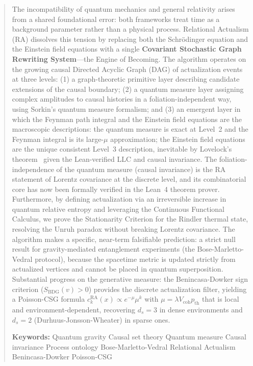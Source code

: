 \documentclass[11pt,a4paper]{article}
\theoremstyle{plain}
\theoremstyle{definition}
\theoremstyle{remark}
\begin{document}
\begin{abstract}
The incompatibility of quantum mechanics and general relativity arises from a
shared foundational error: both frameworks treat time as a background parameter
rather than a physical process. Relational Actualism (RA) dissolves this tension
by replacing both the Schr\"{o}dinger equation and the Einstein field equations
with a single \textbf{Covariant Stochastic Graph Rewriting System}---the Engine
of Becoming. The algorithm operates on the growing causal Directed Acyclic Graph
(DAG) of actualization events at three levels: (1) a graph-theoretic primitive
layer describing candidate extensions of the causal boundary; (2) a quantum
measure layer assigning complex amplitudes to causal histories in a
foliation-independent way, using Sorkin's quantum measure formalism; and (3) an
emergent layer in which the Feynman path integral and the Einstein field equations
are the macroscopic descriptions: the quantum measure is exact at Level~2 and
the Feynman integral is its large-$\mu$ approximation; the Einstein field
equations are the unique consistent Level~3 description, inevitable by Lovelock's
theorem~\citep{Lovelock1971} given the Lean-verified LLC and causal invariance. The foliation-independence of the quantum measure
(causal invariance) is the RA statement of Lorentz covariance at the discrete
level, and its combinatorial core has now been formally verified in the Lean~4
theorem prover. Furthermore, by defining actualization via an irreversible
increase in quantum relative entropy and leveraging the Continuous Functional
Calculus, we prove the Stationarity Criterion for the Rindler thermal state,
resolving the Unruh paradox without breaking Lorentz covariance. The algorithm
makes a specific, near-term falsifiable prediction: a strict null result for
gravity-mediated entanglement experiments (the Bose-Marletto-Vedral protocol),
because the spacetime metric is updated strictly from actualized vertices and
cannot be placed in quantum superposition. Substantial progress on the
generative measure: the Benincasa-Dowker sign criterion
($S_{\mathrm{BDG}}(v) > 0$) provides the discrete actualization filter,
yielding a Poisson-CSG formula $c_k^{\mathrm{RA}}(x) \propto e^{-\mu}\mu^k$
with $\mu = \lambda V_{\mathrm{coh}} p_{\mathrm{th}}$ that is local and
environment-dependent, recovering $d_s = 3$ in dense environments and
$d_s = 2$ (Durhuus-Jonsson-Wheater) in sparse ones.

\medskip\noindent
\textbf{Keywords:} Quantum gravity \textperiodcentered{} Causal set theory
\textperiodcentered{} Quantum measure \textperiodcentered{} Causal invariance
\textperiodcentered{} Process ontology \textperiodcentered{}
Bose-Marletto-Vedral \textperiodcentered{} Relational Actualism
\textperiodcentered{} Benincasa-Dowker \textperiodcentered{} Poisson-CSG
\end{abstract}
\end{document}
